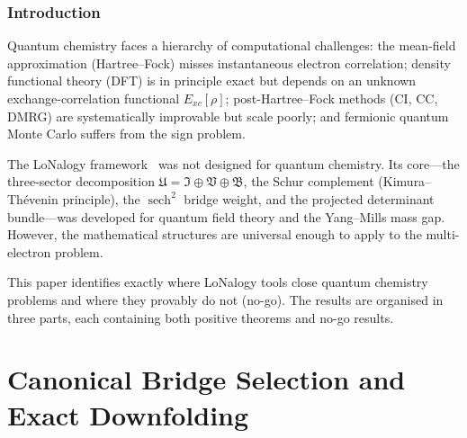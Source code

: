\documentclass[12pt]{article}
\theoremstyle{plain}
\theoremstyle{definition}
\numberwithin{equation}{section}
\newcommand{\fU}{\mathfrak{U}}
\newcommand{\fI}{\mathfrak{I}}
\newcommand{\fV}{\mathfrak{V}}
\newcommand{\fB}{\mathfrak{B}}
\DeclareMathOperator{\sech}{sech}
\begin{document}
\begin{titlepage}
\begin{abstract}
\textbf{(C) Modified P\"oschl--Teller local normal form.}
At any non-degenerate stationary point of a 1D reaction path,
a canonical coordinate change brings the PES into $\sech^2$ form
with agreement through fourth order.  A no-go theorem shows this
cannot be a universal PES law: the obstruction is the cubic
anharmonicity $V'''(q_*)\neq 0$ of generic potentials.

Four no-go theorems delineate the exact boundaries of applicability.
\end{abstract}
\end{titlepage}

\setcounter{page}{1}
\tableofcontents
\newpage


\section*{Introduction}

Quantum chemistry faces a hierarchy of computational challenges:
the mean-field approximation (Hartree--Fock) misses instantaneous
electron correlation; density functional theory (DFT) is in
principle exact but depends on an unknown exchange-correlation
functional $E_{xc}[\rho]$; post-Hartree--Fock methods (CI, CC,
DMRG) are systematically improvable but scale poorly; and
fermionic quantum Monte Carlo suffers from the sign problem.

The LoNalogy framework~\cite{LoNalogyv87,YMmassGap} was not
designed for quantum chemistry.  Its core---the three-sector
decomposition $\fU=\fI\oplus\fV\oplus\fB$, the Schur complement
(Kimura--Th\'evenin principle), the $\sech^2$ bridge weight, and
the projected determinant bundle---was developed for quantum field
theory and the Yang--Mills mass gap.  However, the mathematical
structures are universal enough to apply to the multi-electron
problem.

This paper identifies exactly where LoNalogy tools close quantum
chemistry problems and where they provably do not (no-go).
The results are organised in three parts, each containing both
positive theorems and no-go results.


\part{Canonical Bridge Selection and Exact Downfolding}
\end{document}
